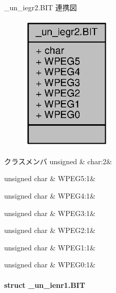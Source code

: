 \+\_\+un\+\_\+iegr2.\+B\+I\+T 連携図
\nopagebreak
\begin{figure}[H]
\begin{center}
\leavevmode
\includegraphics[width=123pt]{d9/d20/struct__un__iegr2_8BIT__coll__graph}
\end{center}
\end{figure}
\begin{DoxyFields}{クラスメンバ}
unsigned\label{3694s_8h_aa87deb01c5f539e6bda34829c8ef2368}
&
char\+:2&
\\
\hline

unsigned char\label{3694s_8h_a0c1f9b8a76523d7bc2400f966ba14993}
&
W\+P\+E\+G5\+:1&
\\
\hline

unsigned char\label{3694s_8h_a064384618d0526599f0a83111b4a355d}
&
W\+P\+E\+G4\+:1&
\\
\hline

unsigned char\label{3694s_8h_a309950fef5555383459fc59f5769d70a}
&
W\+P\+E\+G3\+:1&
\\
\hline

unsigned char\label{3694s_8h_a1bdd6de5b27daa35e5639864dc36729e}
&
W\+P\+E\+G2\+:1&
\\
\hline

unsigned char\label{3694s_8h_af086c635834f8f49c3f9173a9f8c46c8}
&
W\+P\+E\+G1\+:1&
\\
\hline

unsigned char\label{3694s_8h_a0b39dae39855314407bbd789e16f808e}
&
W\+P\+E\+G0\+:1&
\\
\hline

\end{DoxyFields}
\label{struct__un__ienr1_8BIT}
\paragraph{struct \+\_\+un\+\_\+ienr1.\+B\+I\+T}


